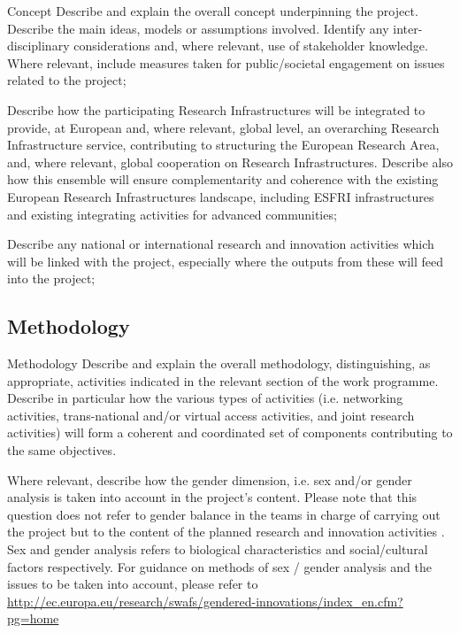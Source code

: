 \begin{todo}{Concept}\color{red}
Describe and explain the overall concept underpinning the project. Describe the main ideas, models or assumptions involved. Identify any inter-disciplinary considerations and, where relevant, use of stakeholder knowledge. Where relevant, include measures taken for public/societal engagement on issues related to the project;
  
Describe how the participating Research Infrastructures will be integrated to provide, at European and, where relevant, global level, an overarching Research Infrastructure service, contributing to structuring the European Research Area, and, where relevant, global cooperation on Research Infrastructures. Describe also how this ensemble will ensure complementarity and coherence with the existing European Research Infrastructures landscape, including ESFRI infrastructures and existing integrating activities for advanced communities;

Describe any national or international research and innovation activities which will be linked with the project, especially where the outputs from these will feed into the project;
\end{todo}



\subsection{Methodology}

\begin{todo}{Methodology}\color{red}
  Describe and explain the overall methodology, distinguishing, as appropriate, activities indicated in the relevant section of the work programme. Describe in particular how the various types of activities (i.e. networking activities, trans-national and/or virtual access activities, and joint research activities) will form a coherent and coordinated set of components contributing to the same objectives.

  Where relevant, describe how the gender dimension, i.e. sex and/or gender analysis is taken into account in the project’s content.
  Please note that this question does not refer to gender balance in the teams in charge of carrying out the project but to the content of the planned research and innovation activities . Sex and gender analysis refers to biological characteristics and social/cultural factors respectively. For guidance on methods of sex / gender analysis and the issues to be taken into account, please refer to \url{http://ec.europa.eu/research/swafs/gendered-innovations/index_en.cfm?pg=home} 
\end{todo}

